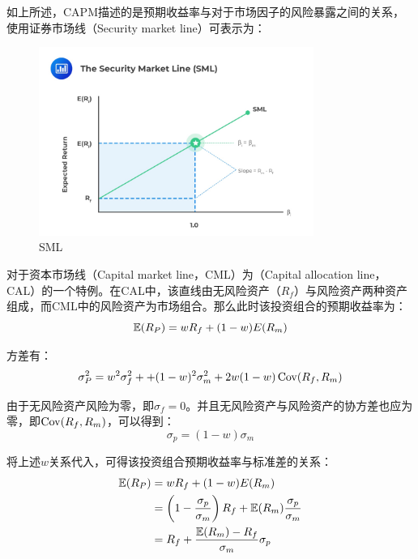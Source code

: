 \documentclass[11pt]{article}
\begin{document}
如上所述，CAPM描述的是预期收益率与对于市场因子的风险暴露之间的关系，使用证券市场线（Security market line）可表示为：
\begin{figure}[H]
    \centering
    \includegraphics[width=0.8\textwidth]{fig/sml.png}
    \caption{SML}
    \label{fig:sml}
\end{figure}

对于资本市场线（Capital market line，CML）为（Capital allocation line，CAL）的一个特例。在CAL中，该直线由无风险资产（$R_f$）与风险资产两种资产组成，而CML中的风险资产为市场组合。那么此时该投资组合的预期收益率为：
\begin{equation*}
    \mathbb{E}(R_P) = w R_f + (1-w) E(R_m)
\end{equation*}

方差有：
\begin{equation*}
    \sigma_P^2 = w^2 \sigma_f^2 + + (1-w)^2 \sigma_m^2 + 2w(1-w) \operatorname{Cov}(R_f,R_m)
\end{equation*}

由于无风险资产风险为零，即$\sigma_f = 0$。并且无风险资产与风险资产的协方差也应为零，即$\operatorname{Cov}(R_f,R_m)$，可以得到：
\begin{equation*}
    \sigma_p = (1-w) \sigma_m
\end{equation*}

将上述$w$关系代入，可得该投资组合预期收益率与标准差的关系：
\begin{align*}
    \mathbb{E}(R_P) &= w R_f + (1-w) E(R_m) \\
    &= \left(1 - \frac{\sigma_p}{\sigma_m} \right) R_f + \mathbb{E}(R_m) \frac{\sigma_p}{\sigma_m} \\
    &= R_f + \frac{\mathbb{E}(R_m) - R_f}{\sigma_m} \sigma_p
\end{align*}
\end{document}
